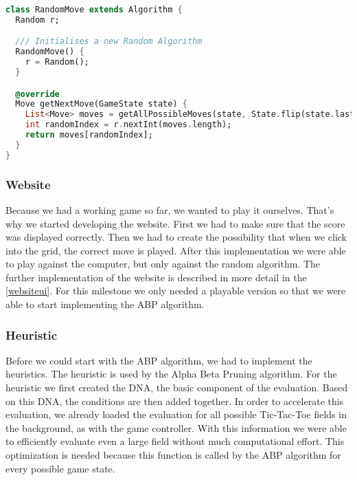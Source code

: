 \begin{lstlisting}[language=Dart,caption={Implementation of the \texttt{RandomMove}}]
class RandomMove extends Algorithm {
  Random r;

  /// Initialises a new Random Algorithm
  RandomMove() {
    r = Random();
  }

  @override
  Move getNextMove(GameState state) {
    List<Move> moves = getAllPossibleMoves(state, State.flip(state.lastMove.state));
    int randomIndex = r.nextInt(moves.length);
    return moves[randomIndex];
  }
}
\end{lstlisting}

\subsubsection{Website}
Because we had a working game so far, we wanted to play it ourselves. That's why we started developing the website. First we had to make sure that the score was displayed correctly. Then we had to create the possibility that when we click into the grid, the correct move is played. After this implementation we were able to play against the computer, but only against the random algorithm. The further implementation of the website is described in more detail in the \autoref{websiteui}. For this milestone we only needed a playable version so that we were able to start implementing the \ac{ABP} algorithm.

\subsubsection{Heuristic}
Before we could start with the \ac{ABP} algorithm, we had to implement the heuristics. The heuristic is used by the Alpha Beta Pruning algorithm. For the heuristic we first created the DNA, the basic component of the evaluation. Based on this DNA, the conditions are then added together. In order to accelerate this evaluation, we already loaded the evaluation for all possible Tic-Tac-Toe fields in the background, as with the game controller. With this information we were able to efficiently evaluate even a large field without much computational effort. This optimization is needed because this function is called by the \ac{ABP} algorithm for every possible game state.

